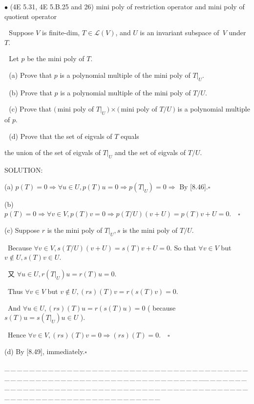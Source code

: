 \documentclass[a4paper, 11pt, UTF8]{article}
\def\Lm{\mathcal{L}}
\begin{document}
\begin{large}
{\small $\bullet$} ({\normalsize 4E 5.31, 4E 5.B.25 and 26}) {\timessl\normalsize \quad mini poly of restriction operator and mini poly of quotient operator}\par\,\,
{\timessl\Large 
Suppose $V$ is finite-dim, $T\in \Lm(V)$, and $U$ is an invariant subspace of \,$V$ under $T$.}\par\,\,
{\timessl\Large Let $p$ be the mini poly of $T.$}\par\,\,
(a) {\timessl\Large Prove that $p$ is a polynomial multiple of the mini poly of $T|_U$.}\par\,\,
(b) {\timessl\Large Prove that $p$ is a polynomial multiple of the mini poly of $T/U$.}\par\,\,
(c) {\timessl\Large Prove that
$(\,$mini poly of $T|_U\,) \times (\,$mini poly of $T/U\,)$ is a polynomial multiple of $p$.
}\par\,\,
(d) {\timessl\Large Prove that the set of eigvals of $T$ equals}\par\qquad
{\timessl\Large the union of the set of eigvals of $T|_U$ and the set of eigvals of $T/U$.
}\par
{\timesbf S\footnotesize{OLUTION:}}\par\quad
(a) $p(T)=0\Rightarrow\forall u\in U,p(T)u=0\Rightarrow p(T|_U)=0\Rightarrow$ By [8.46].$\square$\par\quad
(b) $p(T)=0\Rightarrow\forall v\in V,p(T)v=0\Rightarrow p(T/U)(v+U)=p(T)v+U=0.\quad\square$\par\quad
(c) Suppose $r$ is the mini poly of $T|_U,s$ is the mini poly of $T/U.$\par\qquad\,
Because $\forall v\in V,s(T/U)(v+U)=s(T)v+U=0.$
So that $\forall v\in V$ but $v\not\in U,s(T)v\in U.$\par\qquad\,
又 $\forall u\in U,r(T|_U)u=r(T)u=0.$\par\qquad\,
Thus $\forall v\in V$ but $v\not\in U,(rs)(T)v=r(s(T)v)=0.$\par\qquad\,
And $\forall u\in U,(rs)(T)u=r(s(T)u)=0$ ( because $s(T)u=s(T|_U)u\in U$ ).\par\qquad\,
Hence $\forall v\in V, (rs)(T)v=0\Rightarrow (rs)(T)=0.\quad\square$\par\quad
(d) By [8.49], immediately.\quad$\square$\par
{\tiny \_\,\_\,\_\,\_\,\_\,\_\,\_\,\_\,\_\,\_\,\_\,\_\,\_\,\_\,\_\,\_\,\_\,\_\,\_\,\_\,\_\,\_\,\_\,\_\,\_\,\_\,\_\,\_\,\_\,\_\,\_\,\_\,\_\,\_\,\_\,\_\,\_\,\_\,\_\,\_\,\_\,\_\,\_\,\_\,\_\,\_\,\_\,\_\,\_\,\_\,\_\,\_\,\_\,\_\,\_\,\_\,\_\,\_\,\_\,\_\,\_\,\_\,\_\,\_\,\_\,\_\,\_\,\_\,\_\,\_\,\_\_\,\_\,\_\,\_\,\_\,\_\,\_\,\_\,\_\,\_\,\_\,\_\,\_\,\_\,\_\,\_\,\_\,\_\,\_\,\_\,\_\,\_\,\_\,\_\,\_\,\_\,\_\,\_\,\_\,\_\,\_\,\_\,\_\,\_\,\_\,\_\,\_\,\_\,\_\,\_\,\_\,\_\,\_\,\_\,\_\,\_\,\_\,\_\,\_\,\_\,\_\,\_\,\_\,\_\,\_\,\_\,\_\,\_\,\_\,\_\,\_\,\_\,\_\,\_\,\_\,\_\,\_\,\_\,\_\,\_\,\_}{\tiny\,\par}


\end{large}
\end{document}
